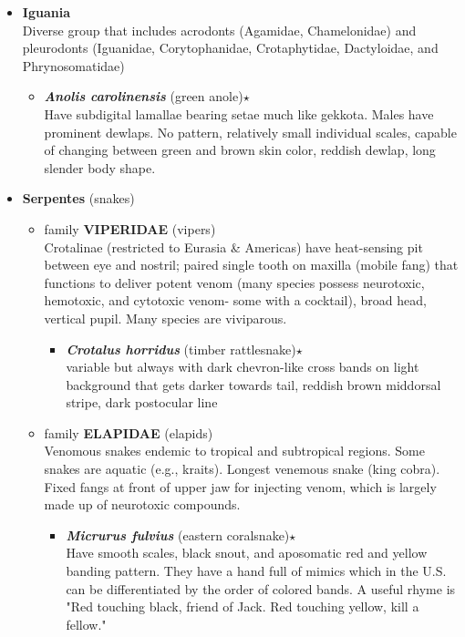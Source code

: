 \documentclass[a4paper,12pt]{article}
\begin{document}
\begin{description}
\begin{itemize}
\begin{itemize}
\begin{itemize}
    \end{itemize}
  \end{itemize}
  \item{\textbf{Iguania}} \\ Diverse group that includes acrodonts (Agamidae, Chamelonidae) and pleurodonts (Iguanidae, Corytophanidae, Crotaphytidae, Dactyloidae, and Phrynosomatidae)
  \begin{itemize}
    \item{\textbf{\textit{Anolis carolinensis}} (green anole)$\star$} \\ Have subdigital lamallae bearing setae much like gekkota. Males have prominent dewlaps. No pattern, relatively small individual scales, capable of changing between green and brown skin color, reddish dewlap, long slender body shape.
  \end{itemize}
  \item{\textbf{Serpentes} (snakes)}
  \begin{itemize}
    \item family {\textbf{VIPERIDAE}} (vipers) \\ Crotalinae (restricted to Eurasia \& Americas) have heat-sensing pit between eye and nostril; paired single tooth on maxilla (mobile fang) that functions to deliver potent venom (many species possess neurotoxic, hemotoxic, and cytotoxic venom- some with a cocktail), broad head, vertical pupil. Many species are viviparous.
    \begin{itemize}
      \item{\textbf{\textit{Crotalus horridus}} (timber rattlesnake)$\star$} \\ variable but always with dark chevron-like cross bands on light background that gets darker towards tail, reddish brown middorsal stripe, dark postocular line
    \end{itemize}
    \item family {\textbf{ELAPIDAE}} (elapids) \\ Venomous snakes endemic to tropical and subtropical regions. Some snakes are aquatic (e.g., kraits). Longest venemous snake (king cobra). Fixed fangs at front of upper jaw for injecting venom, which is largely made up of neurotoxic compounds.
    \begin{itemize}
      \item{\textbf{\textit{Micrurus fulvius}} (eastern coralsnake)$\star$} \\ Have smooth scales, black snout, and aposomatic red and yellow banding pattern. They have a hand full of mimics which in the U.S. can be differentiated by the order of colored bands. A useful rhyme is "Red touching black, friend of Jack. Red touching yellow, kill a fellow."

\end{itemize}
\end{itemize}
\end{itemize}
\end{description}
\end{document}
